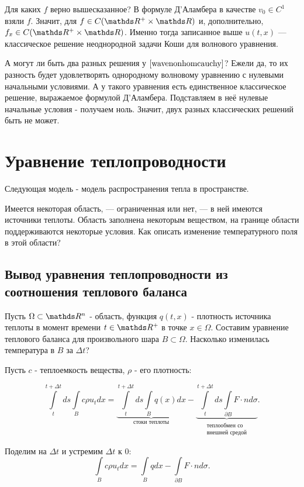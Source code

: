 Для каких $f$ верно вышесказанное? В формуле Д'Аламбера в качестве $v_0 \in C^1$ взяли $f$. Значит, для $f \in C(\real^+ \times \real)$ и, дополнительно, $f_x \in C(\real^+ \times \real)$. Именно тогда записанное выше $u(t,x)$ --- классическое решение неоднородной задачи Коши для волнового уравнения.

А могут ли быть два разных решения у $\eqref{wavenonhomcauchy}$? Ежели да, то их разность будет удовлетворять однородному волновому уравнению с нулевыми начальными условиями. А у такого уравнения есть единственное классическое решение, выражаемое формулой Д'Аламбера. Подставляем в неё нулевые начальные условия - получаем ноль. Значит, двух разных классических решений быть не может.

\section{Уравнение теплопроводности}
Следующая модель - модель распространения тепла в пространстве.

Имеется некоторая область, --- ограниченная или нет, --- в ней имеются источники теплоты. Область заполнена некоторым веществом, на границе области поддерживаются некоторые условия. Как описать изменение температурного поля в этой области?

\subsection{Вывод уравнения теплопроводности из соотношения теплового баланса}

Пусть $\Omega \subset \real^n$ - область, функция $q(t,x)$ - плотность источника теплоты в момент времени $t \in \real^+$ в точке $x \in \Omega$. Составим уравнение теплового баланса для произвольного шара $B \subset \Omega$. Насколько изменилась температура в $B$ за $\Delta t$?

Пусть $c$ - теплоемкость вещества, $\rho$ - его плотность:

$$ \int \limits_t^{t +\Delta t} ds \int \limits_B  c \rho u_t dx = \underbrace {\int \limits_t^{t + \Delta t} ds \int \limits_B q(x) dx}_{\text{стоки теплоты}} - \underbrace {\int \limits_t^{t + \Delta t} ds \int \limits_{\partial B} F \cdot n d \sigma}_{\substack{\text{теплообмен со} \\ \text{внешней средой}}}.$$

Поделим на $\Delta t$ и устремим $\Delta t$ к $0$:
$$ \int \limits_B c \rho u_t dx = \int \limits_B q dx - \int \limits_{\partial B} F \cdot n d \sigma. $$


